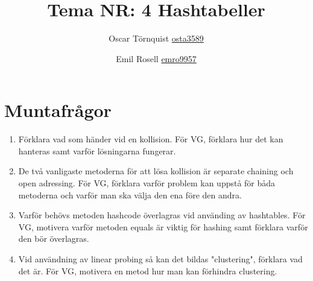 \documentclass[a5paper,10pt,oneside]{article}
\title{Tema NR: 4 Hashtabeller }
\author{Oscar Törnquist \url{osta3589} \and Emil Rosell \url{emro9957}}
\begin{document}
\maketitle


\section*{Muntafrågor}
\begin{enumerate}
\item Förklara vad som händer vid en kollision. För VG, förklara hur det kan hanteras samt varför lösningarna fungerar.
\item De två vanligaste metoderna för att lösa kollision är separate chaining och open adressing. För VG, förklara varför problem kan uppstå för båda metoderna och varför man ska välja den ena före den andra.
\item Varför behövs metoden hashcode överlagras vid använding av hashtables. För VG, motivera varför metoden equals är viktig för hashing samt förklara varför den bör överlagras.
\item Vid användning av linear probing så kan det bildas "clustering", förklara vad det är. För VG, motivera en metod hur man kan förhindra clustering.

\end{enumerate}
\end{document}
